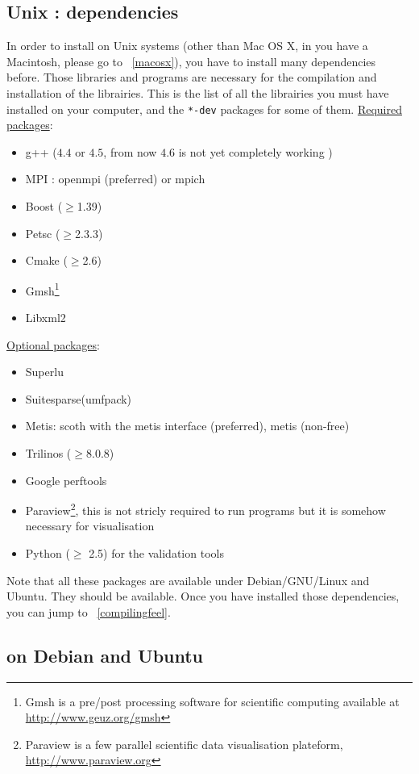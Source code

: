 \subsection{Unix : dependencies}
\label{sec:about-dependencies}

In order to install \feel on Unix systems (other than Mac OS X, in you have a Macintosh, please go to ~\ref{macosx}), you have to install many dependencies
before. Those libraries and programs are necessary for the
compilation and installation of the \feel librairies.
This is the list of all the librairies you must have installed on your
computer, and the \verb|*-dev| packages for some of them.
\underline{Required packages}:
\begin{itemize}
\item g++ ($4.4$ or $4.5$, from now $4.6$ is not yet	completely working  )
\item MPI : openmpi (preferred) or mpich
\item Boost ($\geq$1.39)
\item Petsc ($\geq$2.3.3)
\item Cmake ($\geq$2.6)
\item Gmsh\footnote{Gmsh is a pre/post processing software for scientific
computing available at \url{http://www.geuz.org/gmsh}}
\item Libxml2
\end{itemize}
\underline{Optional packages}:
\begin{itemize}
\item Superlu
\item Suitesparse(umfpack)
\item Metis: scoth with the metis interface (preferred), metis (non-free)
\item Trilinos ($\geq$8.0.8)
\item Google perftools
\item Paraview\footnote{Paraview is a few parallel scientific data
    visualisation plateform, \url{http://www.paraview.org}}, this is
  not stricly required to run \feel programs but it is somehow
  necessary for visualisation
\item Python ($\geq$ 2.5) for the validation tools
\end{itemize}
Note that all these packages are available under Debian/GNU/Linux and
Ubuntu. They should be available. Once you have installed those dependencies, you can jump to ~\ref{compilingfeel}.

\subsection{\feel on Debian and Ubuntu}
\label{sec:feel-debian-ubuntu}

